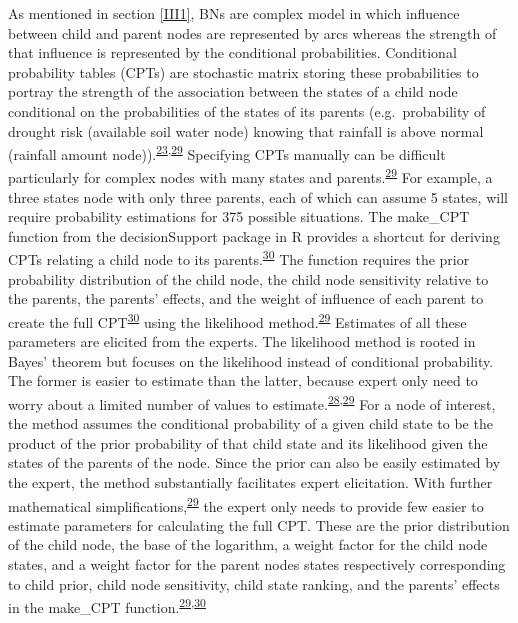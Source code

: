 \documentclass[12pt,oneside]{article}
\begin{document}
As mentioned in section \ref{III1}, BNs are complex model in which influence between child and parent nodes are represented by arcs whereas the strength of that influence is represented by the conditional probabilities. Conditional probability tables (CPTs) are stochastic matrix storing these probabilities to portray the strength of the association between the states of a child node conditional on the probabilities of the states of its parents (e.g.~probability of drought risk (available soil water node) knowing that rainfall is above normal (rainfall amount node)).\textsuperscript{\protect\hyperlink{ref-Scutari_and_Denis_2015}{23},\protect\hyperlink{ref-Hansson_and_Sjokvist_2013}{29}} Specifying CPTs manually can be difficult particularly for complex nodes with many states and parents.\textsuperscript{\protect\hyperlink{ref-Hansson_and_Sjokvist_2013}{29}} For example, a three states node with only three parents, each of which can assume 5 states, will require probability estimations for 375 possible situations. The make\_CPT function from the decisionSupport package in R provides a shortcut for deriving CPTs relating a child node to its parents.\textsuperscript{\protect\hyperlink{ref-Luedeling_and_Goehring_2018}{30}} The function requires the prior probability distribution of the child node, the child node sensitivity relative to the parents, the parents' effects, and the weight of influence of each parent to create the full CPT\textsuperscript{\protect\hyperlink{ref-Luedeling_and_Goehring_2018}{30}} using the likelihood method.\textsuperscript{\protect\hyperlink{ref-Hansson_and_Sjokvist_2013}{29}} Estimates of all these parameters are elicited from the experts. The likelihood method is rooted in Bayes' theorem but focuses on the likelihood instead of conditional probability. The former is easier to estimate than the latter, because expert only need to worry about a limited number of values to estimate.\textsuperscript{\protect\hyperlink{ref-Whitney_et_al_2018a}{28},\protect\hyperlink{ref-Hansson_and_Sjokvist_2013}{29}} For a node of interest, the method assumes the conditional probability of a given child state to be the product of the prior probability of that child state and its likelihood given the states of the parents of the node. Since the prior can also be easily estimated by the expert, the method substantially facilitates expert elicitation. With further mathematical simplifications,\textsuperscript{\protect\hyperlink{ref-Hansson_and_Sjokvist_2013}{29}} the expert only needs to provide few easier to estimate parameters for calculating the full CPT. These are the prior distribution of the child node, the base of the logarithm, a weight factor for the child node states, and a weight factor for the parent nodes states respectively corresponding to child prior, child node sensitivity, child state ranking, and the parents' effects in the make\_CPT function.\textsuperscript{\protect\hyperlink{ref-Hansson_and_Sjokvist_2013}{29},\protect\hyperlink{ref-Luedeling_and_Goehring_2018}{30}}
\end{document}
